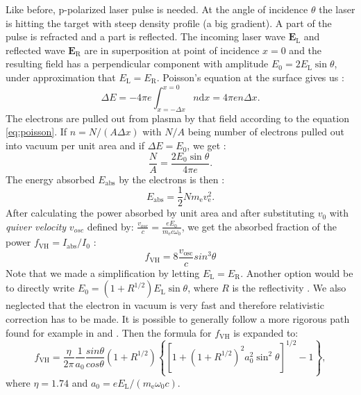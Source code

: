 Like before, p-polarized laser pulse is needed. At the angle of incidence $\theta$ the laser is hitting the target with steep density profile (a big gradient). A part of the pulse is refracted and a part is reflected. The incoming laser wave $\bm{E}_\mathrm{L}$ and reflected wave $\bm{E}_\mathrm{R}$ are in superposition at point of incidence $x=0$ and the resulting field has a perpendicular component with amplitude $E_0 =  2E_\mathrm{L}\sin\theta$, under approximation that $E_\mathrm{L}=E_\mathrm{R}$. Poisson's equation at the surface gives us \cite{absorption2}:
\begin{equation}
	\label{eq:poisson}
	\Delta E = -4\pi e\int_{x=-\Delta x}^{x=0}n \mathrm{d}x=4\pi e n \Delta x.
\end{equation}
The electrons are pulled out from plasma by that field according to the equation \ref{eq:poisson}. If $n=N/\left(A\Delta x\right)$ with $N/A$ being number of electrons pulled out into vacuum per unit area and if $\Delta E = E_0$, we get \cite{absorption2}:
\begin{equation}
	\frac{N}{A} = \frac{2E_0 \sin \theta}{4\pi e}.
\end{equation}
The energy absorbed $E_{\mathrm{abs}}$ by the electrons is then \cite{absorption2}:
\begin{equation}
	E_{\mathrm{abs}} = \frac{1}{2}N m_\mathrm{e} v_{\mathrm{e}}^2.
\end{equation}
After calculating the power absorbed by unit area and after substituting $v_0$ with \textit{quiver velocity} $v_{osc}$ defined by: $\frac{ v_{osc}}{c} = \frac{eE_0}{m_{\mathrm{e}}c\omega_0}$, we get the absorbed fraction of the power $f_{\mathrm{VH}} = I_{\mathrm{abs}}/I_0$ \cite{absorption2}:
\begin{equation}
	f_{\mathrm{VH}} = 8 \frac{v_{\mathrm{osc}}}{c}sin^3\theta
\end{equation}
Note that we made a simplification by letting $E_\mathrm{L}=E_\mathrm{R}$. Another option would be to directly write $E_0 =  \left(1+R^{1/2}\right)E_\mathrm{L}\sin\theta$, where $R$ is the reflectivity \cite{absorption1}. We also neglected that the electron in vacuum is very fast and therefore relativistic correction has to be made. It is possible to generally follow a more rigorous path found for example in \cite{laser-plasma5} and \cite{absorption1}. Then the formula for $f_{\mathrm{VH}}$ is expanded to:
\begin{equation}
	f_{\mathrm{VH}} = \frac{\eta}{2\pi}\frac{1}{a_0}\frac{sin\theta}{cos\theta}\left(1+R^{1/2}\right)\left\{\left[1+\left(1+R^{1/2}\right)^2a_0^2\sin^2\theta\right]^{1/2}-1\right\},
\end{equation}
where $\eta = 1.74$ and $a_0 = eE_\mathrm{L}/(m_\mathrm{e}\omega_0c)$.

